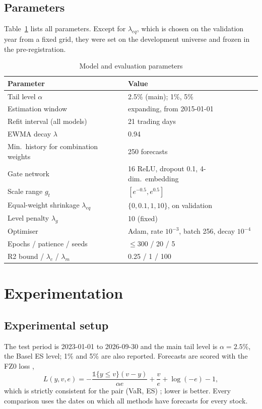 \documentclass[conference]{IEEEtran}
\begin{document}
\subsection{Parameters}
Table~\ref{tab:par} lists all parameters. Except for $\lambda_{eq}$, which is chosen on the validation year from a fixed grid, they were set on the development universe and frozen in the pre-registration.

\begin{table}[t]
\centering
\caption{Model and evaluation parameters}
\label{tab:par}
\footnotesize
\setlength{\tabcolsep}{3pt}
\begin{tabular}{ll}
\toprule
Parameter & Value\\
\midrule
Tail level $\alpha$ & 2.5\% (main); 1\%, 5\%\\
Estimation window & expanding, from 2015-01-01\\
Refit interval (all models) & 21 trading days\\
EWMA decay $\lambda$ & 0.94\\
Min.\ history for combination weights & 250 forecasts\\
Gate network & 16 ReLU, dropout 0.1, 4-dim.\ embedding\\
Scale range $g_t$ & $[e^{-0.5},e^{0.5}]$\\
Equal-weight shrinkage $\lambda_{eq}$ & $\{0,0.1,1,10\}$, on validation\\
Level penalty $\lambda_g$ & 10 (fixed)\\
Optimiser & Adam, rate $10^{-3}$, batch 256, decay $10^{-4}$\\
Epochs / patience / seeds & $\le$300 / 20 / 5\\
R2 bound / $\lambda_c$ / $\lambda_m$ & 0.25 / 1 / 100\\
\bottomrule
\end{tabular}
\end{table}

\section{Experimentation}

\subsection{Experimental setup}
The test period is 2023-01-01 to 2026-09-30 and the main tail level is $\alpha=2.5\%$, the Basel ES level; 1\% and 5\% are also reported. Forecasts are scored with the FZ0 loss \cite{patton2019},
\begin{equation}
L(y,v,e)=-\frac{\mathbb 1\{y\le v\}(v-y)}{\alpha e}+\frac{v}{e}+\log(-e)-1,
\end{equation}
which is strictly consistent for the pair (VaR, ES) \cite{fissler2016}; lower is better. Every comparison uses the dates on which all methods have forecasts for every stock.
\end{document}
